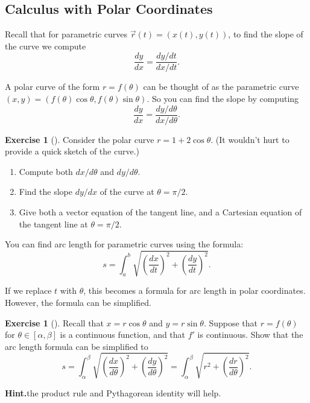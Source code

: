 \documentclass[10pt,]{book}
\theoremstyle{plain}
\theoremstyle{definition}
\theoremstyle{definition}
\theoremstyle{definition}
\theoremstyle{definition}
\newtheorem{exploration}[project]{Exercise}
\theoremstyle{definition}
\numberwithin{equation}{section}
\begin{document}
\subsection[{Calculus with Polar Coordinates}]{Calculus with Polar Coordinates}\label{subsection-21}
Recall that for parametric curves \(\vec r(t) = (x(t),y(t))\), to find the slope of the curve we compute%
\begin{equation*}
\frac{dy}{dx}=\frac{dy/dt}{dx/dt}.
\end{equation*}
%
\par
A polar curve of the form \(r=f(\theta)\) can be thought of as the parametric curve \((x,y) = (f(\theta)\cos\theta,f(\theta)\sin\theta)\). So you can find the slope by computing%
\begin{equation*}
\frac{dy}{dx}=\frac{dy/d\theta}{dx/d\theta}.
\end{equation*}
%
\begin{exploration}[]\label{exploration-95}
Consider the polar curve \(r=1+2\cos \theta\). (It wouldn't hurt to provide a quick sketch of the curve.)%
\begin{enumerate}[font=\bfseries,label=(\alph*),ref=\alph*]
\item\label{task-157} Compute both \(dx/d\theta\) and \(dy/d\theta\).%
\item\label{task-158} Find the slope \(dy/dx\) of the curve at \(\theta=\pi/2\).%
\item\label{task-159} Give both a vector equation of the tangent line, and a Cartesian equation of the tangent line at \(\theta=\pi/2\).%
\end{enumerate}
\end{exploration}
You can find arc length for parametric curves using the formula:%
\begin{equation*}
s=\int_a^b\sqrt{\left(\frac{dx}{dt}\right)^2+\left(\frac{dy}{dt}\right)^2}.
\end{equation*}
%
\par
If we replace \(t\) with \(\theta\), this becomes a formula for arc length in polar coordinates. However, the formula can be simplified.%
\begin{exploration}[]\label{exploration-96}
Recall that \(x=r\cos\theta\) and \(y=r\sin\theta\). Suppose that \(r=f(\theta)\) for \(\theta\in[\alpha,\beta]\) is a continuous function, and that \(f'\) is continuous. Show that the arc length formula can be simplified to%
\begin{equation*}
s=\int_{\alpha}^{\beta}\sqrt{\left(\frac{dx}{d\theta}\right)^2+\left(\frac{dy}{d\theta}\right)^2} 
= \int_{\alpha}^{\beta}\sqrt{r^2+\left(\frac{dr}{d\theta}\right)^2} .
\end{equation*}
%
\par\medskip\noindent%
\textbf{Hint.}\quad the product rule and Pythagorean identity will help.%
\end{exploration}
\end{document}
